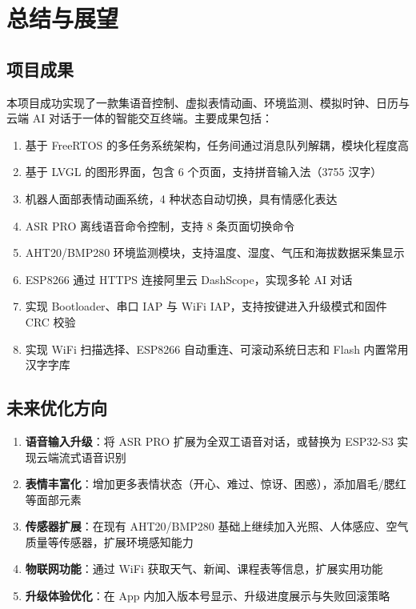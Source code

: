 \documentclass[12pt,a4paper]{ctexart}
\begin{document}
\section{总结与展望}

\subsection{项目成果}

本项目成功实现了一款集语音控制、虚拟表情动画、环境监测、模拟时钟、日历与云端 AI 对话于一体的智能交互终端。主要成果包括：

\begin{enumerate}
    \item 基于 FreeRTOS 的多任务系统架构，任务间通过消息队列解耦，模块化程度高
    \item 基于 LVGL 的图形界面，包含 6 个页面，支持拼音输入法（3755 汉字）
    \item 机器人面部表情动画系统，4 种状态自动切换，具有情感化表达
    \item ASR PRO 离线语音命令控制，支持 8 条页面切换命令
    \item AHT20/BMP280 环境监测模块，支持温度、湿度、气压和海拔数据采集显示
    \item ESP8266 通过 HTTPS 连接阿里云 DashScope，实现多轮 AI 对话
    \item 实现 Bootloader、串口 IAP 与 WiFi IAP，支持按键进入升级模式和固件 CRC 校验
    \item 实现 WiFi 扫描选择、ESP8266 自动重连、可滚动系统日志和 Flash 内置常用汉字字库
\end{enumerate}

\subsection{未来优化方向}

\begin{enumerate}
    \item \textbf{语音输入升级}：将 ASR PRO 扩展为全双工语音对话，或替换为 ESP32-S3 实现云端流式语音识别
    \item \textbf{表情丰富化}：增加更多表情状态（开心、难过、惊讶、困惑），添加眉毛/腮红等面部元素
    \item \textbf{传感器扩展}：在现有 AHT20/BMP280 基础上继续加入光照、人体感应、空气质量等传感器，扩展环境感知能力
    \item \textbf{物联网功能}：通过 WiFi 获取天气、新闻、课程表等信息，扩展实用功能
    \item \textbf{升级体验优化}：在 App 内加入版本号显示、升级进度展示与失败回滚策略
\end{enumerate}
\end{document}
